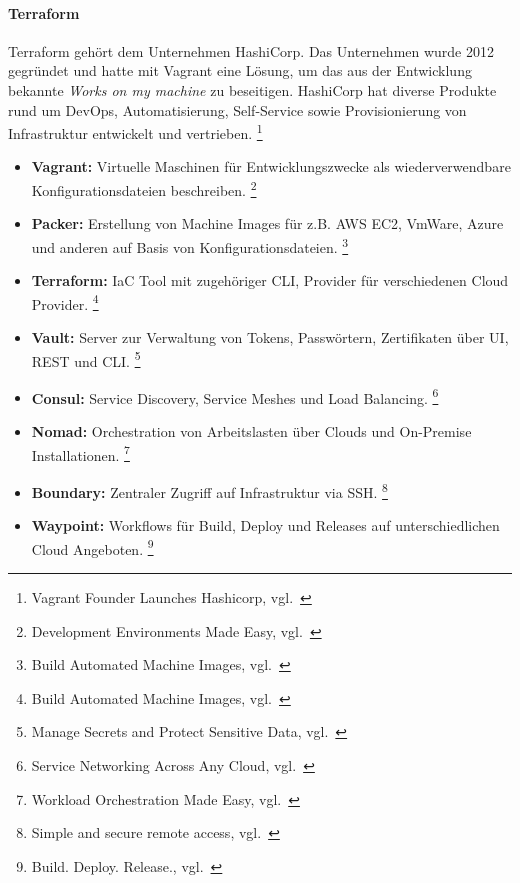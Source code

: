 \paragraph{Terraform}\label{iac_tools_tools_terraform}

Terraform gehört dem Unternehmen HashiCorp.
Das Unternehmen wurde 2012 gegründet und hatte mit Vagrant eine Lösung, um das aus der Entwicklung bekannte \textsl{Works on my machine} zu beseitigen.
HashiCorp hat diverse Produkte rund um DevOps, Automatisierung, Self-Service sowie Provisionierung von Infrastruktur entwickelt und vertrieben.
\footnote{{Vagrant Founder Launches Hashicorp, vgl.~\cite{TECHCRUNCH_TERRAFORM}}}

\begin{itemize}
    \item \textbf{Vagrant:}
    Virtuelle Maschinen für Entwicklungszwecke als wiederverwendbare Konfigurationsdateien beschreiben.
    \footnote{{Development Environments Made Easy, vgl.~\cite{HASHICORP_VAGRANT}}}

    \item \textbf{Packer:}
    Erstellung von Machine Images für z.B. AWS EC2, VmWare, Azure und anderen auf Basis von Konfigurationsdateien.
    \footnote{{Build Automated Machine Images, vgl.~\cite{HASHICORP_PACKER}}}

    \item \textbf{Terraform:}
    IaC Tool mit zugehöriger CLI, Provider für verschiedenen Cloud Provider.
    \footnote{{Build Automated Machine Images, vgl.~\cite{HASHICORP_TERRAFORM}}}

    \item \textbf{Vault:}
    Server zur Verwaltung von Tokens, Passwörtern, Zertifikaten über UI, REST und CLI.
    \footnote{{Manage Secrets and Protect Sensitive Data, vgl.~\cite{HASHICORP_VAULT}}}

    \item \textbf{Consul:}
    Service Discovery, Service Meshes und Load Balancing.
    \footnote{{Service Networking Across Any Cloud, vgl.~\cite{HASHICORP_CONSUL}}}

    \item \textbf{Nomad:}
    Orchestration von Arbeitslasten über Clouds und On-Premise Installationen.
    \footnote{{Workload Orchestration Made Easy, vgl.~\cite{HASHICORP_NOMAD}}}

    \item \textbf{Boundary:}
    Zentraler Zugriff auf Infrastruktur via SSH.
    \footnote{{Simple and secure remote access, vgl.~\cite{HASHICORP_BOUNDARY}}}

    \item \textbf{Waypoint:}
    Workflows für Build, Deploy und Releases auf unterschiedlichen Cloud Angeboten.
    \footnote{{Build. Deploy. Release., vgl.~\cite{HASHICORP_WAYPOINT}}}

\end{itemize}
